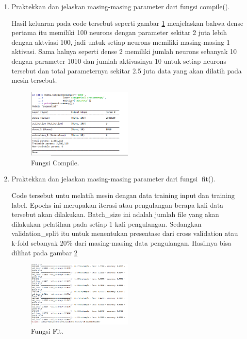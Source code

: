 \begin{enumerate}
\item Praktekkan dan jelaskan masing-masing parameter dari fungsi compile(). \par

Hasil keluaran pada code tersebut seperti gambar \ref{suara7} menjelaskan bahwa dense pertama itu memiliki 100 neurons dengan parameter sekitar 2 juta lebih dengan aktviasi 100, jadi untuk setiap neurons memiliki masing-masing 1 aktivasi. Sama halnya seperti dense 2 memiliki jumlah neurons sebanyak 10 dengan parameter 1010 dan jumlah aktivasinya 10 untuk setiap neurons tersebut dan total parameternya sekitar 2.5 juta data yang akan dilatih pada mesin tersebut.
		\begin{figure}[!htbp]
		\centerline{\includegraphics[width=0.5\textwidth]{figures/im/suara7.png}}
		\caption{Fungsi Compile.}
		\label{suara7}
		\end{figure}

\item Praktekkan dan jelaskan masing-masing parameter dari fungsi fit(). \par

Code tersebut untu melatih mesin dengan data training input dan training label. Epochs ini merupakan iterasi atau pengulangan berapa kali data tersebut akan dilakukan. Batch\_size ini adalah jumlah file yang akan dilakukan pelatihan pada setiap 1 kali pengulangan. Sedangkan validation\_split itu untuk menentukan presentase dari cross validation atau k-fold sebanyak 20\% dari masing-masing data pengulangan. Hasilnya bisa dilihat pada gambar \ref{suara8}
		\begin{figure}[!htbp]
		\centerline{\includegraphics[width=0.5\textwidth]{figures/im/suara8.png}}
		\caption{Fungsi Fit.}
		\label{suara8}
		\end{figure}


\end{enumerate}
